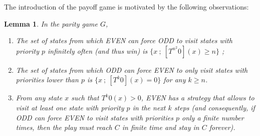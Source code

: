 \documentclass{article}
\newtheorem{lemma}{Lemma}
\begin{document}
The introduction of the payoff game is motivated by the following observations:
\begin{lemma}
  In the parity game $G$,
  \begin{enumerate}
  \item The set of states from which EVEN can force ODD to visit states with priority $p$ infinitely often (and thus win) is $\{ x ~;~ [T^{n^2}0](x) \ge n \}$ ;
  \item The set of states from which ODD can force EVEN to \emph{only} visit states with priorities lower than $p$ is $\{ x ~;~ [T^k 0](x)=0 \}$ for any $k \ge n$.
  \item From any state $x$ such that $T^k 0(x)>0$, EVEN has a strategy that allows to visit at least one state with priority $p$ in the next $k$ steps (and consequently, if ODD can force EVEN to visit states with priorities $p$ only a finite number times, then the play must reach $C$ in finite time and stay in $C$ forever). 
  \end{enumerate}
\end{lemma}
\end{document}
